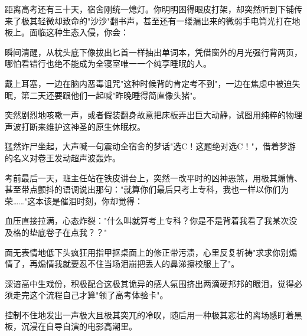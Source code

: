 \documentclass{exam-zh}
\begin{document}
\begin{question}[points = 5]
  距离高考还有三十天，宿舍刚统一熄灯。你明明困得眼皮打架，却突然听到下铺传来了极其轻微却致命的"沙沙"翻书声，甚至还有一缕漏出来的微弱手电筒光打在地板上。面临这种生态入侵，你会：
  \begin{choices}
    \item 瞬间清醒，从枕头底下像拔出匕首一样抽出单词本，凭借窗外的月光强行背两页，哪怕看错行也绝不能成为全寝室唯一一个纯享睡眠的人。
    \item 戴上耳塞，一边在脑内恶毒诅咒"这种时候背的肯定考不到"，一边在焦虑中被迫失眠，第二天还要跟他们一起喊"昨晚睡得简直像头猪"。
    \item 突然剧烈地咳嗽一声，或者假装翻身故意把床板弄出巨大动静，试图用纯粹的物理声波打断来维护这神圣的原生休眠权。
    \item 猛然诈尸坐起，大声喊一句震动全宿舍的梦话"选C！这题绝对选C！"，借着梦游的名义对卷王发动超声波轰炸。
  \end{choices}
\end{question}

\begin{question}[points = 5]
  考前最后一天，班主任站在铁皮讲台上，突然一改平时的凶神恶煞，用极其煽情、甚至带点颤抖的语调说出那句："就算你们最后只考上专科，我也一样以你们为荣……"这本该是催泪时刻，你却觉得：
  \begin{choices}
    \item 血压直接拉满，心态炸裂："什么叫就算考上专科？你是不是背着我看了我某次没及格的垫底卷子在点我？？"
    \item 面无表情地低下头疯狂用指甲抠桌面上的修正带污渍，心里反复祈祷"求求你别煽情了，再煽情我就要忍不住当场泪崩把丢人的鼻涕擦校服上了"。
    \item 深谙高中生戏份，积极配合这极其诡异的感人氛围挤出两滴硬邦邦的眼泪，觉得必须走完这个流程自己才算"领了高考体验卡"。
    \item 控制不住地发出一声极大且极其突兀的冷叹，随后用一种极其悲壮的离场感盯着黑板，沉浸在自导自演的电影高潮里。
  \end{choices}
\end{question}
\end{document}
